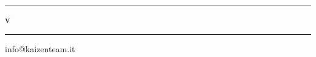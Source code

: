 \begin{titlepage}
\begin{center}
	
	\hrule
	\vspace{3mm}
	\Huge{\textbf{\doctitle{} v\lastversion{}}}
	\vspace{3mm}
	\hrule


	\vspace{2cm}

	\begin{minipage}{0.4\textwidth}
		\begin{flushleft} \large
			\Large{info@kaizenteam.it}
		\end{flushleft}
	\end{minipage}
	\begin{minipage}{0.4\textwidth}
		\begin{flushright} \large
			\Large{}
		\end{flushright}
	\end{minipage}

  \end{center}
\end{titlepage}

